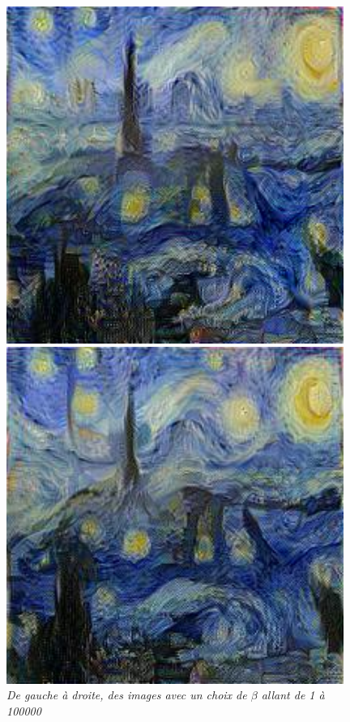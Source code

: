 \documentclass{article}
\begin{document}
\begin{figure}[!htb]
\begin{minipage}{0.16\textwidth}
\end{minipage}%
\begin{minipage}{0.16\textwidth}
\centering
\includegraphics[width=0.98\textwidth]{../Images/transfer/paris_starrynight_1e4_500.jpg}
\end{minipage}%
\begin{minipage}{0.16\textwidth}
\centering
\includegraphics[width=0.98\textwidth]{../Images/transfer/paris_starrynight_1e5_500.jpg}
\end{minipage}
\caption{\textit{De gauche à droite, des images avec un choix de $\beta$ allant de 1 à 100000}}
\label{fig:varier_beta}
\end{figure}
\end{document}
